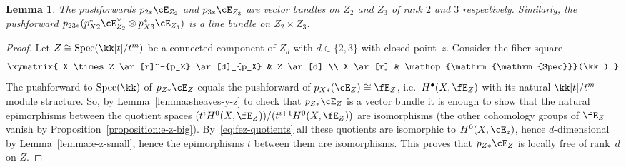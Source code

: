 \documentclass[11pt]{amsart}
\DeclareMathOperator{\Spec}{\mathrm{Spec}}
\theoremstyle{plain}
\newtheorem{lemma}[theorem]{Lemma}
\theoremstyle{definition}
\theoremstyle{remark}
\begin{document}
\begin{lemma}
\label{lemma:ps-ez}
The pushforwards $p_{2*}\cE_{Z_2}$ and $p_{3*}\cE_{Z_3}$ are vector bundles on $Z_2$ and $Z_3$ of rank $2$ and $3$ respectively.
Similarly, 
the pushforward $p_{23*}(p_{X2}^*\cE_{Z_2}^\vee \otimes p_{X3}^*\cE_{Z_3})$ is a line bundle on $Z_2 \times Z_3$.
\end{lemma}
\begin{proof}
Let $Z \cong \Spec(\kk[t]/t^m)$ be a connected component of $Z_d$ with $d \in \{2,3\}$ with closed point~$z$.
Consider the fiber square
\begin{equation*}
\xymatrix{
X \times Z \ar[r]^-{p_Z} \ar[d]_{p_X} & Z \ar[d] \\
X \ar[r] & \Spec(\kk)
}
\end{equation*}
The pushforward to $\Spec(\kk)$ of $p_{Z*}\cE_{Z}$ equals the pushforward of $p_{X*}(\cE_{Z}) \cong \fE_Z$, 
i.e.~$H^\bullet(X,\fE_{Z})$ with its natural $\kk[t]/t^m$-module structure.
So, by Lemma~\ref{lemma:sheaves-y-z} to check that $p_{Z*}\cE_{Z}$ is a vector bundle
it is enough to show that the natural epimorphisms between the quotient spaces $(t^iH^0(X,\fE_{Z}))/(t^{i+1}H^0(X,\fE_{Z}))$ are isomorphisms
(the other cohomology groups of $\fE_Z$ vanish by Proposition~\ref{proposition:e-z-big}).
By~\eqref{eq:fez-quotients} all these quotients are isomorphic to $H^0(X,\cE_z)$, 
hence $d$-dimensional by Lemma~\ref{lemma:e-z-small}, 
hence the epimorphisms $t$ between them are isomorphisms.
This proves that $p_{Z*}\cE_{Z}$ is locally free of rank~$d$ on $Z$.


\end{proof}
\end{document}
